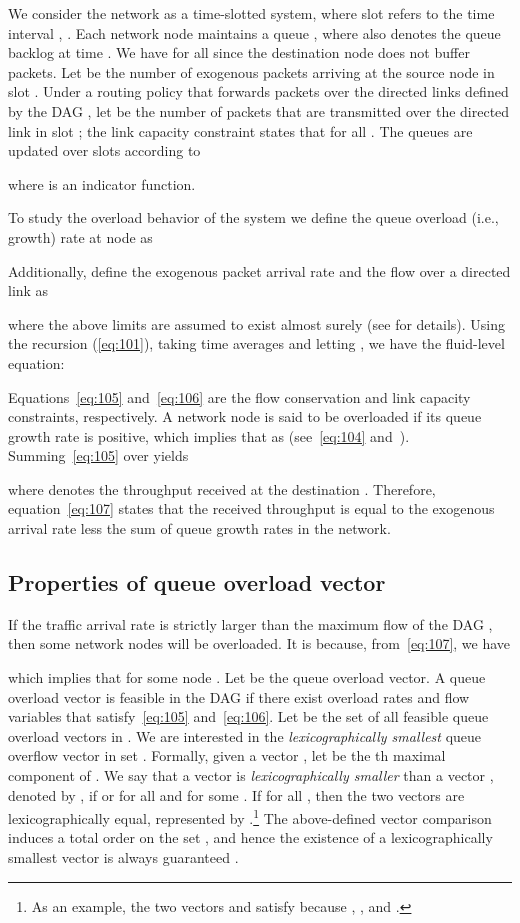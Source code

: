 \documentclass{sig-alternate-2013}
\begin{document}
We consider the network as a time-slotted system, where slot  refers to the time interval , . Each network node  maintains a queue , where  also denotes the queue backlog at time . We have  for all  since the destination node  does not buffer packets. Let  be the number of exogenous packets arriving at the source node  in slot . Under a routing policy that forwards packets over the directed links defined by the DAG , let  be the number of packets that are transmitted over the directed link  in slot ; the link capacity constraint states that  for all . The queues  are updated over slots according to

where  is an indicator function. 

To study the overload behavior of the system we define
the queue overload (i.e., growth) rate at node  as

Additionally, define the exogenous packet arrival rate  and  the flow  over a directed link   as

where the above limits are assumed to exist almost surely (see \cite{georgiadis} for details). Using the recursion (\ref{eq:101}), taking time averages and letting , we have the fluid-level equation:

Equations~\eqref{eq:105} and~\eqref{eq:106} are the flow conservation and link capacity constraints, respectively. A network node  is said to be overloaded if its queue growth rate  is positive, which implies that  as  (see~\eqref{eq:104} and~\cite{Nee10book}). Summing~\eqref{eq:105} over  yields

where  denotes the throughput received at the destination  .
Therefore, equation~\eqref{eq:107} states that the received throughput 
is equal to the exogenous arrival rate  less the sum of queue growth rates  in the network.

\subsection{Properties of queue overload vector}

If the traffic arrival rate  is strictly larger than the maximum flow  of the DAG , then some network nodes will be overloaded. It is because, from~\eqref{eq:107}, we have

which implies that  for some node . Let  be the queue overload vector. A queue overload vector  is feasible in the DAG  if there exist overload rates  and flow variables  that satisfy~\eqref{eq:105} and~\eqref{eq:106}. Let  be the set of all feasible queue overload vectors in . We are interested in the \emph{lexicographically smallest} queue overflow vector in set . Formally, given a vector , let  be the th maximal component of . We say that a vector  is \emph{lexicographically smaller} than a vector , denoted by , if  or  for all  and  for some . If  for all , then the two vectors are lexicographically equal, represented by .\footnote{As an example, the two vectors  and  satisfy  because , , and .} 
The above-defined vector comparison induces a total order on the set  , and hence the existence of a lexicographically smallest vector is always   guaranteed \cite{georgatsos}. 
\end{document}
